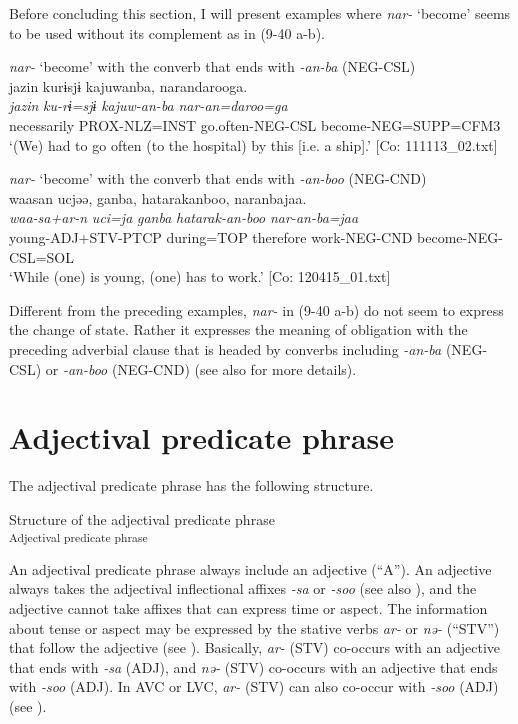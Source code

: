 Before concluding this section, I will present examples where \textit{nar-} ‘become’ seems to be used without its complement as in (9-40 a-b).

\ea \label{ex:9.40}

\ea \textit{nar-} ‘become’ with the converb that ends with \textit{{}-an-ba} (NEG-CSL)\\
 \glll  jazin  kurɨsjɨ  kajuwanba,  narandarooga.\\
    \textit{jazin}  \textit{ku-rɨ=sjɨ}  \textit{kajuw-an-ba}  \textit{nar-an=daroo=ga}\\
    necessarily  PROX-NLZ=INST  go.often-NEG-CSL  become-NEG=SUPP=CFM3\\
    \glt     ‘(We) had to go often (to the hospital) by this [i.e. a ship].’ [Co: 111113\_02.txt]

\ex\textit{nar-} ‘become’ with the converb that ends with \textit{{}-an-boo} (NEG-CND)\\
 \glll  waasan  ucjəə,  ganba,  hatarakanboo, naranbajaa.\\
    \textit{waa-sa+ar-n}  \textit{uci=ja}  \textit{ganba}  \textit{hatarak-an-boo}  \textit{nar-an-ba=jaa}\\
    young-ADJ+STV-PTCP  during=TOP  therefore  work-NEG-CND  become-NEG-CSL=SOL\\
  \glt     ‘While (one) is young, (one) has to work.’ [Co: 120415\_01.txt]
  \z
\z

Different from the preceding examples, \textit{nar-} in (9-40 a-b) do not seem to express the change of state. Rather it expresses the meaning of obligation with the preceding adverbial clause that is headed by converbs including \textit{{}-an-ba} (NEG-CSL) or \textit{{}-an-boo} (NEG-CND) (see also  for more details).

\section{Adjectival predicate phrase}\label{sec:9.2}

The adjectival predicate phrase has the following structure.

\ea   Structure of the adjectival predicate phrase \label{ex:9.41}\\\textsubscript{Adjectival predicate phrase}
\z

An adjectival predicate phrase always include an adjective (“A”). An adjective always takes the adjectival inflectional affixes \textit{{}-sa} or \textit{{}-soo} (see also ), and the adjective cannot take affixes that can express time or aspect. The information about tense or aspect may be expressed by the stative verbs \textit{ar-} or \textit{nə-} (“STV”) that follow the adjective (see ). Basically, \textit{ar-} (STV) co-occurs with an adjective that ends with \textit{{}-sa} (ADJ), and \textit{nə-} (STV) co-occurs with an adjective that ends with \textit{{}-soo} (ADJ). In AVC or LVC, \textit{ar-} (STV) can also co-occur with \textit{{}-soo} (ADJ) (see ).

